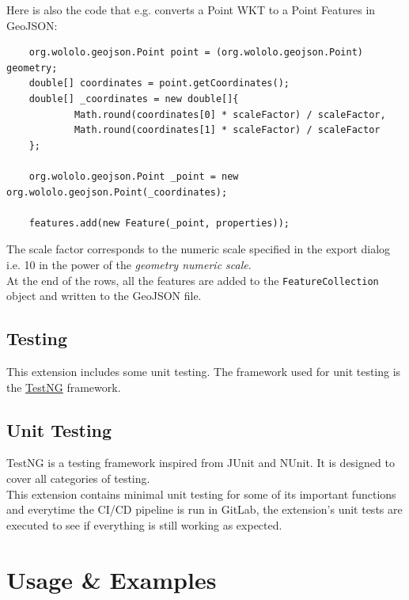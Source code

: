 Here is also the code that e.g. converts a Point WKT to a Point Features in GeoJSON:
\begin{verbatim}
    org.wololo.geojson.Point point = (org.wololo.geojson.Point) geometry;
    double[] coordinates = point.getCoordinates();
    double[] _coordinates = new double[]{
            Math.round(coordinates[0] * scaleFactor) / scaleFactor,
            Math.round(coordinates[1] * scaleFactor) / scaleFactor
    };

    org.wololo.geojson.Point _point = new org.wololo.geojson.Point(_coordinates);

    features.add(new Feature(_point, properties));
\end{verbatim}
The scale factor corresponds to the numeric scale specified in the export dialog i.e. 10 in the power of the \textit{geometry numeric scale}.\\
\newline
At the end of the rows, all the features are added to the \texttt{FeatureCollection} object and written to the GeoJSON file.
\subsection{Testing}
This extension includes some unit testing. The framework used for unit testing is the \href{https://testng.org/}{TestNG} framework.
\subsection{Unit Testing}
TestNG is a testing framework inspired from JUnit and NUnit. It is designed to cover all categories of testing.\\
\newline
This extension contains minimal unit testing for some of its important functions and everytime the CI/CD pipeline is run in GitLab, the
extension's unit tests are executed to see if everything is still working as expected.
\pagebreak
\section{Usage \& Examples}
